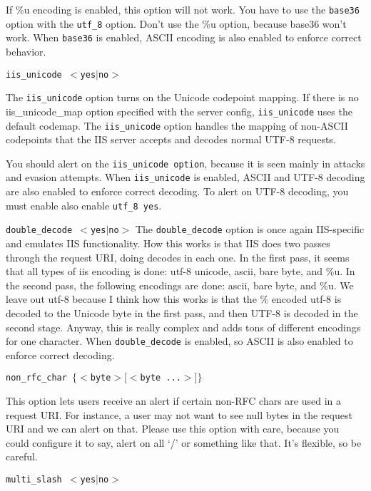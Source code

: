 \documentclass[english]{report}
\newcounter{slistnum}
\newenvironment{slist}
{ \begin{list}{ {\bf \arabic{slistnum}.} }{\usecounter{slistnum} } }
{ \end{list} }
\begin{document}
\begin{slist}
If \%u encoding is enabled, this option will not work.  You have to use the
\texttt{base36} option with the \texttt{utf\_8} option.  Don't use the \%u option, because base36
won't work.  When \texttt{base36} is enabled, ASCII encoding is also enabled to enforce correct
behavior.

\item \texttt{iis\_unicode $<$yes$|$no$>$}

The \texttt{iis\_unicode} option turns on the Unicode codepoint mapping.  If there is no
iis\_unicode\_map option specified with the server config, \texttt{iis\_unicode} uses the
default codemap.  The \texttt{iis\_unicode} option handles the mapping of non-ASCII
codepoints that the IIS server accepts and decodes normal UTF-8 requests.

You should alert on the \texttt{iis\_unicode option}, because it is seen mainly in
attacks and evasion attempts.  When \texttt{iis\_unicode} is enabled, ASCII and
UTF-8 decoding are also enabled to enforce correct decoding.  To alert on UTF-8 decoding, you
 must enable also enable \texttt{utf\_8 yes}. 

\item \texttt{double\_decode $<$yes$|$no$>$}
The \texttt{double\_decode} option is once again IIS-specific and emulates IIS
functionality.  How this works is that IIS does two passes through the request
URI, doing decodes in each one.  In the first pass, it seems that all types of
iis encoding is done: utf-8 unicode, ascii, bare byte, and \%u.  In the second
pass, the following encodings are done:  ascii, bare byte, and \%u.  We leave out
utf-8 because I think how this works is that the \% encoded utf-8 is decoded to
the Unicode byte in the first pass, and then UTF-8 is decoded in the second stage.
Anyway, this is really complex and adds tons of different encodings for one
character.  When \texttt{double\_decode} is enabled, so ASCII is also enabled to enforce correct decoding.

\item \texttt{non\_rfc\_char $\{ <$byte$> [<$byte ...$>] \}$}

This option lets users receive an alert if certain non-RFC chars are used in a
request URI.  For instance, a user may not want to see null bytes in the
request URI and we can alert on that.  Please use this option with
care, because you could configure it to say, alert on all `/' or something like
that.  It's flexible, so be careful.

\item \texttt{multi\_slash $<$yes$|$no$>$}


\end{slist}
\end{document}
